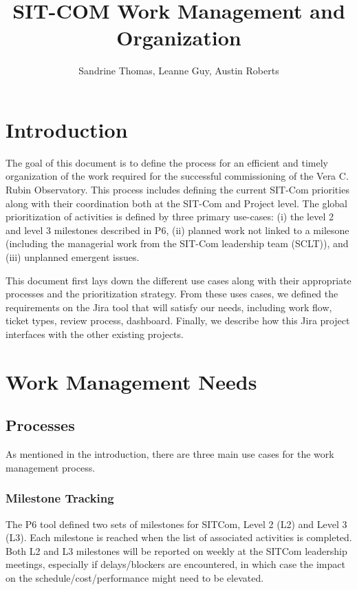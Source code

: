 \documentclass[SE,authoryear,toc]{lsstdoc}
\title{SIT-COM Work Management and Organization}
\author{%
Sandrine Thomas, Leanne Guy, Austin Roberts
}
\date{\vcsDate}
\begin{document}
\maketitle

\section{Introduction}
The goal of this document is to define the process for an efficient and timely organization of the work required for the successful commissioning of the Vera C. Rubin Observatory. 
This process includes defining the current SIT-Com priorities along with their coordination both at the SIT-Com and Project level. 
The global prioritization of activities is defined by three primary use-cases: (i) the level 2 and level 3 milestones described in P6, (ii) planned work not linked to a milesone (including the managerial work from the SIT-Com leadership team (SCLT)), and (iii)  unplanned emergent issues.

This document first lays down the different use cases along with their appropriate processes and the prioritization strategy.
 From these uses cases, we defined the requirements on the Jira tool that will satisfy our needs, including work flow, ticket types, review process, dashboard. 
 Finally, we describe how this Jira project interfaces with the other existing projects. 

\section{Work Management Needs}
\subsection{Processes}
As mentioned in the introduction, there are three main use cases for the work management process. 
\subsubsection{Milestone Tracking}
The P6 tool defined two sets of milestones for SITCom, Level 2 (L2) and Level 3 (L3). Each milestone is reached when the list of associated activities is completed. 
Both L2 and L3 milestones will be reported on weekly at the SITCom leadership meetings, especially if delays/blockers are encountered, in which case the impact on the schedule/cost/performance might need to be elevated.
\end{document}
